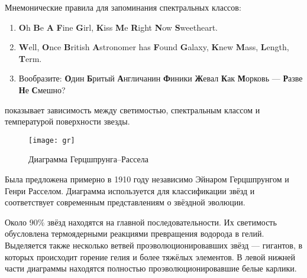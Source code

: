 Мнемонические правила для запоминания спектральных классов:
\begin{enumerate}[1)]
\item\textbf{O}h \textbf{B}e \textbf{A} \textbf{F}ine \textbf{G}irl, \textbf{K}iss \textbf{M}e \textbf{R}ight \textbf{N}ow \textbf{S}weetheart.
\item\textbf{W}ell, \textbf{O}nce \textbf{B}ritish \textbf{A}stronomer has \textbf{F}ound \textbf{G}alaxy, \textbf{K}new \textbf{M}ass, \textbf{L}ength, \textbf{T}erm.
\item Вообразите: \textbf{О}дин \textbf{Б}ритый \textbf{А}нгличанин \textbf{Ф}иники \textbf{Ж}евал \textbf{К}ак \textbf{М}орковь --- \textbf{Р}азве \textbf{Н}е \textbf{С}мешно?
\end{enumerate}

 показывает зависимость между светимостью, спектральным классом и температурой поверхности звезды. 

\begin{figure}
	\centering
	\texttt{[image: gr]}
 	\caption{Диаграмма Герцшпрунга--Рассела}
 	\label{pic:d-cep}
\end{figure}


Была предложена примерно в 1910 году независимо Эйнаром Герцшпрунгом и Генри Расселом. Диаграмма используется для классификации звёзд и соответствует современным представлениям о звёздной эволюции.

Около $90 \%$ звёзд находятся на главной последовательности. Их светимость обусловлена термоядерными реакциями превращения водорода в гелий. Выделяется также несколько ветвей проэволюционировавших звёзд --- гигантов, в которых происходит горение гелия и более тяжёлых элементов. В левой нижней части диаграммы находятся полностью проэволюционировавшие белые карлики.

